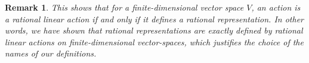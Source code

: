 \message{ !name(roughdraft.tex)}\documentclass[a4paper]{article}
\theoremstyle{prrt}
\newtheorem{remark}{Remark}[theorem]
\begin{document}

\begin{remark}
  This shows that for a finite-dimensional vector space $V$, an action is a rational linear action if and only if it defines a rational representation.
  In other words, we have shown that rational representations are exactly defined by rational linear actions on finite-dimensional vector-spaces, which justifies the choice of the names of our definitions.
\end{remark}
\end{document}
